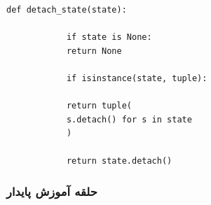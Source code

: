\documentclass[12pt,a4paper]{article}
\begin{document}
\begin{tcolorbox}[colback=softgreen,colframe=mygreen,title=\textbf{کد جدا کردن حالت پنهان}]
	\begin{latin}
		\begin{lstlisting}[caption={Hidden State Detach Function}]
			def detach_state(state):
			
			if state is None:
			return None
			
			if isinstance(state, tuple):
			
			return tuple(
			s.detach() for s in state
			)
			
			return state.detach()
		\end{lstlisting}
	\end{latin}
\end{tcolorbox}

\subsubsection{حلقه آموزش پایدار}
\end{document}
